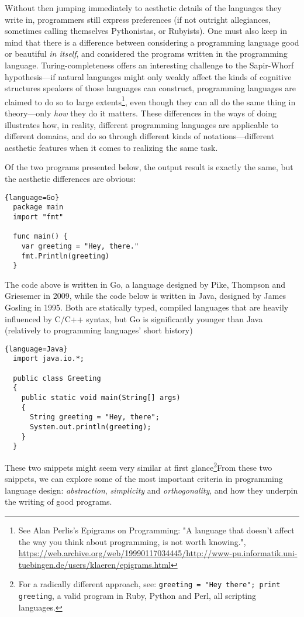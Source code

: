 \documentclass{article}
\begin{document}
Without  then jumping immediately to aesthetic details of the languages they write in, programmers still express preferences (if not outright allegiances, sometimes calling themselves Pythonistas, or Rubyists). One must also keep in mind that there is a difference between considering a programming language good or beautiful \emph{in itself}, and considered the programs written in the programming language. Turing-completeness offers an interesting challenge to the Sapir-Whorf hypothesis—if natural languages might only weakly affect the kinds of cognitive structures speakers of those languages can construct, programming languages are claimed to do so to large extents\footnote{See Alan Perlis's Epigrams on Programming: "A language that doesn't affect the way you think about programming, is not worth knowing.", \url{https://web.archive.org/web/19990117034445/http://www-pu.informatik.uni-tuebingen.de/users/klaeren/epigrams.html}}, even though they can all do the same thing in theory—only \emph{how} they do it matters. These differences in the ways of doing illustrates how, in reality, different programming languages are applicable to different domains, and do so through different kinds of notations—different aesthetic features when it comes to realizing the same task.

Of the two programs presented below, the output result is exactly the same, but the aesthetic differences are obvious:

\begin{lstlisting}{language=Go}
  package main
  import "fmt"

  func main() {
    var greeting = "Hey, there."
    fmt.Println(greeting)
  }
\end{lstlisting}

The code above is written in Go, a language designed by Pike, Thompson and Griesemer in 2009, while the code below is written in Java, designed by James Gosling in 1995. Both are statically typed, compiled languages that are heavily influenced by C/C++ syntax, but Go is significantly younger than Java (relatively to programming languages' short history)

\begin{lstlisting}{language=Java}
  import java.io.*;

  public class Greeting
  {
    public static void main(String[] args)
    {
      String greeting = "Hey, there";
      System.out.println(greeting);
    }
  }
\end{lstlisting}

These two snippets might seem very similar at first glance\footnote{For a radically different approach, see: \lstinline{greeting = "Hey there"; print greeting}, a valid program in Ruby, Python and Perl, all scripting languages.}From these two snippets, we can explore some of the most important criteria in programming language design: \emph{abstraction}, \emph{simplicity} and \emph{orthogonality}\cite{sebesta_concepts_2018}, and how they underpin the writing of good programs.
\end{document}
